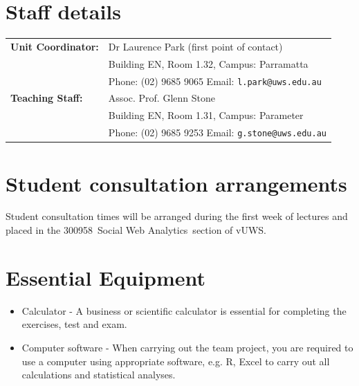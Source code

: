 \documentclass[a4paper,oneside]{book}
\newcommand{\vuws}{vUWS}
\newcommand{\unitcode}{300958}
\newcommand{\unitname}{Social Web Analytics}
\begin{document}





\section{Staff details}
\begin{tabular}{ll}
  \textbf{Unit Coordinator:}  & Dr Laurence Park (first point of
  contact) \\
  & Building EN, Room 1.32, Campus: Parramatta \\
  & Phone: (02) 9685 9065 \quad
  Email: \texttt{l.park@uws.edu.au} \\[0.5em]

   \textbf{Teaching Staff:} & Assoc. Prof. Glenn Stone \\
   & Building EN, Room 1.31, Campus: Parameter \\
   & Phone: (02) 9685 9253 \quad
   Email: \texttt{g.stone@uws.edu.au} \\[0.5em]

\end{tabular}

\section{Student consultation arrangements}

Student consultation times will be arranged during the first week of
lectures and placed in the \unitcode~\unitname~section of \vuws.

\section{Essential Equipment}

\begin{itemize}
\item Calculator - A business or scientific calculator is essential
  for completing the exercises, test and exam.
\item Computer software - When carrying out the team project, you are
  required to use a computer using appropriate software, e.g. R, Excel to
  carry out all calculations and statistical analyses.
\end{itemize}
  
\end{document}
